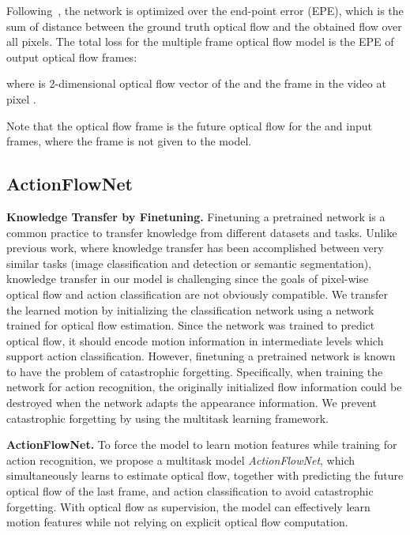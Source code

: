 \documentclass[10pt,twocolumn,letterpaper]{article}
\begin{document}
Following~\cite{FischerDIHHGSCB15}, the network is optimized over the end-point error (EPE), which is the sum of  distance between the ground truth optical flow and the obtained flow over all pixels.
The total loss for the multiple frame optical flow model is the EPE of  output optical flow frames:
\vspace{-.5em}

where  is 2-dimensional optical flow vector of the  and the  frame in the  video at pixel .

Note that the  optical flow frame  is the future optical flow for the  and  input frames, where the  frame is not given to the model.



\subsection{ActionFlowNet}
\label{sec:multi}
\noindent \textbf{Knowledge Transfer by Finetuning.}
Finetuning a pretrained network is a common practice to transfer knowledge from different datasets and tasks.
Unlike previous work, where knowledge transfer has been accomplished between very similar tasks (image classification and detection or semantic segmentation), knowledge transfer in our model is challenging since the goals of pixel-wise optical flow and action classification are not obviously compatible. 
We transfer the learned motion by initializing the classification network using a network trained for optical flow estimation.
Since the network was trained to predict optical flow, it should encode motion information in intermediate levels which support action classification.
However, finetuning a pretrained network is known to have the problem of catastrophic forgetting.
Specifically, when training the network for action recognition, the originally initialized flow information could be destroyed when the network adapts the appearance information.
We prevent catastrophic forgetting by using the multitask learning framework.

\noindent \textbf{ActionFlowNet.}
To force the model to learn motion features while training for action recognition, we propose a multitask model \emph{ActionFlowNet}, which simultaneously learns to estimate optical flow, together with predicting the future optical flow of the last frame, and action classification to avoid catastrophic forgetting.
With optical flow as supervision, the model can effectively learn motion features while not relying on explicit optical flow computation.
\end{document}

